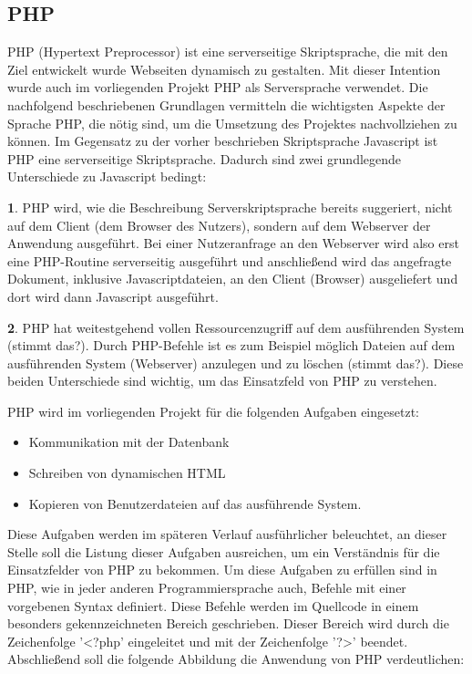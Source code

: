 \subsection{PHP}
\label{sec:Php}

PHP (Hypertext Preprocessor) ist eine serverseitige Skriptsprache, die mit den Ziel entwickelt wurde Webseiten dynamisch
zu gestalten.
Mit dieser Intention wurde auch im vorliegenden Projekt PHP als Serversprache verwendet. Die nachfolgend beschriebenen
Grundlagen vermitteln die wichtigsten Aspekte der Sprache PHP, die nötig sind, um die Umsetzung des Projektes
nachvollziehen zu können.
Im Gegensatz zu der vorher beschrieben Skriptsprache Javascript ist PHP eine serverseitige Skriptsprache. Dadurch sind
zwei grundlegende Unterschiede zu Javascript bedingt:

\textbf{1}. PHP wird, wie die Beschreibung Serverskriptsprache bereits suggeriert, nicht auf dem Client (dem Browser des Nutzers),
sondern auf dem Webserver der Anwendung ausgeführt. Bei einer Nutzeranfrage an den Webserver wird also erst eine PHP-Routine serverseitig ausgeführt und anschließend wird das angefragte Dokument, inklusive
Javascriptdateien, an den Client (Browser) ausgeliefert und dort wird dann Javascript ausgeführt.

\textbf{2}. PHP hat weitestgehend vollen Ressourcenzugriff auf dem ausführenden System (stimmt das?). Durch PHP-Befehle ist es zum Beispiel möglich Dateien auf dem ausführenden System (Webserver) anzulegen und zu löschen (stimmt das?).
Diese beiden Unterschiede sind wichtig, um das Einsatzfeld von PHP zu verstehen.

PHP wird im vorliegenden Projekt für die folgenden Aufgaben eingesetzt:
\begin{itemize}
  \item Kommunikation mit der Datenbank
  \item Schreiben von dynamischen HTML
  \item Kopieren von Benutzerdateien auf das ausführende System.
\end{itemize}

Diese Aufgaben werden im späteren Verlauf ausführlicher beleuchtet, an dieser Stelle soll die Listung dieser Aufgaben
ausreichen, um ein Verständnis für die Einsatzfelder von PHP zu bekommen.
Um diese Aufgaben zu erfüllen sind in PHP, wie in jeder anderen Programmiersprache auch, Befehle mit einer vorgebenen
Syntax definiert. Diese Befehle werden im Quellcode in einem besonders gekennzeichneten Bereich geschrieben. Dieser
Bereich wird durch die Zeichenfolge '<?php' eingeleitet und mit der Zeichenfolge '?>' beendet.
Abschließend soll die folgende Abbildung die Anwendung von PHP verdeutlichen:


